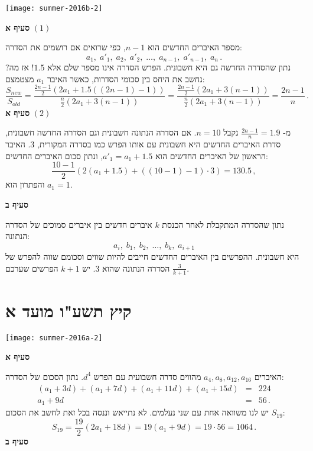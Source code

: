 \begin{center}
\texttt{[image: summer-2016b-2]}
\end{center}
\vspace{-1ex}

\textbf{סעיף א}
$(1)$

מספר האיברים החדשים הוא
$n-1$,
כפי שרואים אם רושמים את הסדרה:
\[
a_1,\; a'_1,\; a_2,\; a'_2,\; \ldots,\; a_{n-1},\; a'_{n-1},\; a_n\,.
\]
נתון שהסדרה החדשה גם היא חשבונית. הפרש הסדרה אינו מספר שלם אלא
$1.5$!
אז מה? נחשב את היחס בין סכומי הסדרות, כאשר האיבר
$a_1$
מצטמצם:
\[
\frac{S_{\mathit{new}}}{S_{\mathit{old}}}= \frac{\displaystyle\frac{2n-1}{2}(2a_1+1.5((2n-1)-1))}{\displaystyle\frac{n}{2}(2a_1+3(n-1))}=\frac{\displaystyle\frac{2n-1}{2}(2a_1+3(n-1))}{\displaystyle\frac{n}{2}(2a_1+3(n-1))}=\frac{2n-1}{n}\,.
\]
\textbf{סעיף א}
$(2)$

מ-%
$\displaystyle\frac{2n-1}{n}=1.9$
נקבל
$n=10$. 
אם הסדרה הנתונה חשבונית וגם הסדרה החדשה חשבונית, סדרת האיברים החדשים היא חשבונית עם אותו הפרש כמו בסדרה המקורית, 
$3$.
%
האיבר הראשון של האיברים החדשים הוא
$a'_1=a_1+1.5$,
ונתון סכום האיברים החדשים:
\[
\frac{10-1}{2}(2(a_1+1.5)+((10-1)-1)\cdot 3) = 130.5\,,
\]
והפתרון הוא
$a_1=1$.

\textbf{סעיף ב}

נתון שהסדרה המתקבלת לאחר הכנסת
$k$
איברים חדשים בין איברים סמוכים של הסדרה הנתונה:
\[
a_i,\; b_1,\; b_2,\; \ldots,\; b_k,\; a_{i+1}
\]
היא חשבונית. ההפרשים בין האיברים החדשים חייבים להיות שווים וסכומם שווה להפרש של הסדרה הנתונה שהוא
$3$.
יש
$k+1$
הפרשים שערכם
$\displaystyle\frac{3}{k+1}$.


\np
\section{קיץ תשע"ו מועד א}

\begin{center}
\texttt{[image: summer-2016a-2]}
\end{center}
\vspace{-4ex}

\textbf{סעיף א}

האיברים
$a_4,a_8,a_{12},a_{16}$
מהווים סדרה חשבועית עם הפרש
$d^4$.
נתון הסכום של הסדרה:
\begin{eqnarray*}
(a_1+3d)+(a_1+7d)+(a_1+11d)+(a_1+15d)&=&224\\
a_1+9d&=&56\,.
\end{eqnarray*}
יש לנו משוואה אחת עם שני נעלמים. לא נתייאש וננסה בכל זאת לחשב את הסכום
$S_{19}$:
\[
S_{19}=\frac{19}{2}(2a_1+18d) = 19(a_1+9d)=19\cdot 56 = 1064\,.
\]
\vspace{-1ex}
\textbf{סעיף ב}

